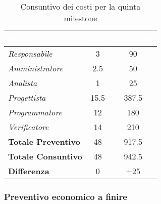 \begin{table}[H]
    \renewcommand\arraystretch{1.5}
    \centering
    \begin{tabular}{|l|c|c|}
    \hline
    \rowcolor[HTML]{036400}
    \textcolor{white}{\textbf{Ruolo}} & \multicolumn{1}{l|}{\textcolor{white}{\textbf{Ore}}} & \multicolumn{1}{l|}{\textcolor{white}{\textbf{Costo (€)}}} \\ \hline
    \rowcolor[HTML]{EFEFEF}\textit{Responsabile}      & 3           & 90                 \\ \hline
    \rowcolor[HTML]{C0C0C0}\textit{Amministratore}    & 2.5         & 50                 \\ \hline
    \rowcolor[HTML]{EFEFEF}\textit{Analista}          & 1           & 25                 \\ \hline
    \rowcolor[HTML]{C0C0C0}\textit{Progettista}       & 15.5        & 387.5                 \\ \hline
    \rowcolor[HTML]{EFEFEF}\textit{Programmatore}     & 12          & 180                 \\ \hline
    \rowcolor[HTML]{C0C0C0}\textit{Verificatore}      & 14          & 210                 \\ \hline
    \rowcolor[HTML]{EFEFEF}\textbf{Totale Preventivo} & 48          & 917.5                \\ \hline
    \rowcolor[HTML]{C0C0C0}\textbf{Totale Consuntivo} & 48          & 942.5            \\ \hline
    \rowcolor[HTML]{EFEFEF}\textbf{Differenza}        & 0           & +25                \\ \hline
    \end{tabular}
    \caption{Consuntivo dei costi per la quinta milestone}
\end{table}

\subsubsection{Preventivo economico a finire}

